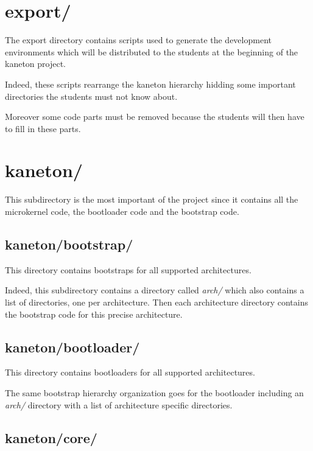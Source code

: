 %
%

\section{export/}

The export directory contains scripts used to generate the
development environments which will be distributed to the students
at the beginning of the kaneton project.

Indeed, these scripts rearrange the kaneton hierarchy hidding some
important directories the students must not know about.

Moreover some code parts must be removed because the students will
then have to fill in these parts.

%
%

\section{kaneton/}

This subdirectory is the most important of the project since it contains
all the microkernel code, the bootloader code and the bootstrap code.

%
%

\subsection{kaneton/bootstrap/}

This directory contains bootstraps for all supported architectures.

Indeed, this subdirectory contains a directory called \textit{arch/} which
also contains a list of directories, one per architecture. Then each
architecture directory contains the bootstrap code for this precise
architecture.

%
%

\subsection{kaneton/bootloader/}

This directory contains bootloaders for all supported architectures.

The same bootstrap hierarchy organization goes for the bootloader
including an \textit{arch/} directory with a list of architecture
specific directories.

%
%

\subsection{kaneton/core/}


